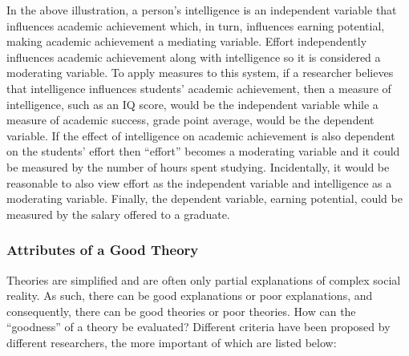 In the above illustration, a person's intelligence is an independent variable that influences academic achievement which, in turn, influences earning potential, making academic achievement a mediating variable. Effort independently influences academic achievement along with intelligence so it is considered a moderating variable. To apply measures to this system, if a researcher believes that intelligence influences students' academic achievement, then a measure of intelligence, such as an IQ score, would be the independent variable while a measure of academic success, grade point average, would be the dependent variable. If the effect of intelligence on academic achievement is also dependent on the students' effort then ``effort'' becomes a moderating variable and it could be measured by the number of hours spent studying. Incidentally, it would be reasonable to also view effort as the independent variable and intelligence as a moderating variable. Finally, the dependent variable, earning potential, could be measured by the salary offered to a graduate.

\subsubsection{Attributes of a Good Theory}

Theories are simplified and are often only partial explanations of complex social reality. As such, there can be good explanations or poor explanations, and consequently, there can be good theories or poor theories. How can the ``goodness'' of a theory be evaluated? Different criteria have been proposed by different researchers, the more important of which are listed below:

